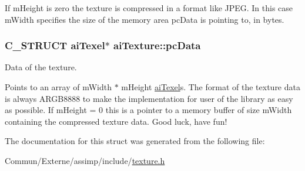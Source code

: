 If m\+Height is zero the texture is compressed in a format like J\+P\+EG. In this case m\+Width specifies the size of the memory area pc\+Data is pointing to, in bytes. 
\subsubsection[{\texorpdfstring{pc\+Data}{pcData}}]{\setlength{\rightskip}{0pt plus 5cm}C\+\_\+\+S\+T\+R\+U\+CT {\bf ai\+Texel}$\ast$ ai\+Texture\+::pc\+Data}\hypertarget{structai_texture_aeb07528748b6e49d2d81c60006024f9a}{}\label{structai_texture_aeb07528748b6e49d2d81c60006024f9a}
Data of the texture.

Points to an array of m\+Width $\ast$ m\+Height \hyperlink{structai_texel}{ai\+Texel}\textquotesingle{}s. The format of the texture data is always A\+R\+G\+B8888 to make the implementation for user of the library as easy as possible. If m\+Height = 0 this is a pointer to a memory buffer of size m\+Width containing the compressed texture data. Good luck, have fun! 

The documentation for this struct was generated from the following file\+:\begin{DoxyCompactItemize}
\item 
Commun/\+Externe/assimp/include/\hyperlink{texture_8h}{texture.\+h}\end{DoxyCompactItemize}
